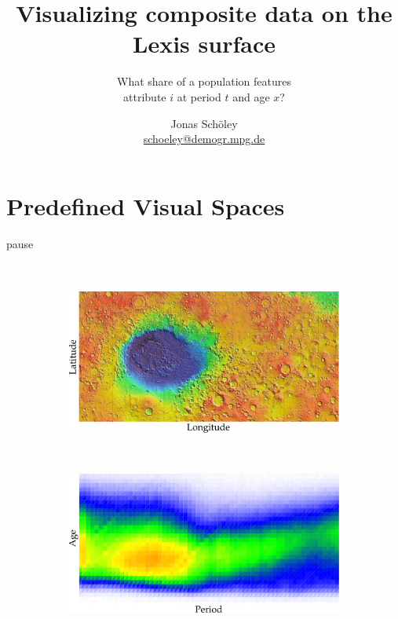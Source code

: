 \documentclass{beamer}
\title{Visualizing composite data on the Lexis surface}
\subtitle{What share of a population features\\attribute $i$ at period $t$ and age $x$?}
\author{Jonas Schöley\\\url{schoeley@demogr.mpg.de}}
\institute{\texttt{[image: ./misc/EDSDLogo.pdf]}}
\begin{document}
{
%
\begin{frame}[plain]
\titlepage
\end{frame}
}

\section{Predefined Visual Spaces} %


\begin{frame}{pause}
\frametitle{\insertsection}

\begin{columns}[c]

\begin{figure}[!htb]
\centering
\begin{subfigure}[c]{\textwidth}
\includegraphics[width = \textwidth]{../fig/plot-spatial_map.pdf}
\end{subfigure}\\
\begin{subfigure}[c]{\textwidth}
\includegraphics[width = \textwidth]{../fig/plot-temporal_map.pdf}
\end{subfigure}
\end{figure}


\end{columns}
\end{frame}
\end{document}
